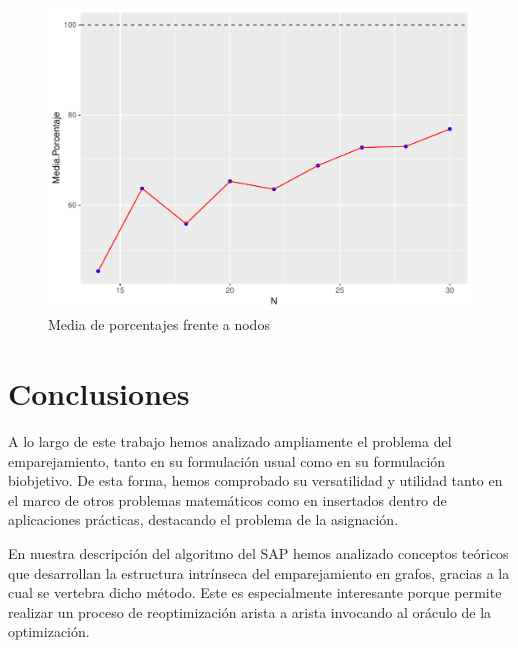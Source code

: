 \documentclass[twoside,a4paper,openright,12pt]{book}
\begin{document}
\begin{figure}[h!]
\centering
\includegraphics[scale=0.7]{plot11}
\caption{Media de porcentajes frente a nodos}
\end{figure}

\chapter{Conclusiones}
A lo largo de este trabajo hemos analizado ampliamente el problema del emparejamiento, tanto en su formulación usual como en su formulación biobjetivo. De esta forma, hemos comprobado su versatilidad y utilidad tanto en el marco de otros problemas matemáticos como en insertados dentro de aplicaciones prácticas, destacando el problema de la asignación.

En nuestra descripción del algoritmo del SAP hemos analizado conceptos teóricos que desarrollan la estructura intrínseca del emparejamiento en grafos, gracias a la cual se vertebra dicho método. Este es especialmente interesante porque permite realizar un proceso de reoptimización arista a arista invocando al oráculo de la optimización.
\end{document}
